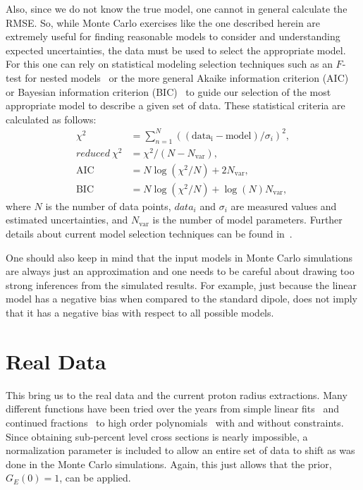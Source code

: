 \documentclass[10pt,aps,prc,twocolumn]{revtex4-1}
\begin{document}
Also, since we do not know the true model, one cannot in general calculate the RMSE. So, while Monte Carlo exercises 
like the one described herein are extremely useful for finding reasonable models to consider and understanding
expected uncertainties, the data must be used to select the appropriate model. 
For this one can rely on statistical modeling selection techniques such as an $F$-test for
nested models~\cite{Bevington:2003,James:2006,Sirca:2016} or the more general Akaike information criterion (AIC)~\cite{Akaike:1974} 
or Bayesian information criterion (BIC)~\cite{Schwarz:1978} 
to guide our selection of the most appropriate model to describe a given set of data.
These statistical criteria are calculated as follows: 
\begin{align}
\chi^2         & = \sum_{n=1}^{N}((\mathrm{data_i} - \mathrm{model}) / \sigma_i)^2, \\
reduced~\chi^2 & = \chi^2/ (N - N_{\mathrm{var}}),  \\
\mathrm{AIC}            & = N \log(\chi^2/N) + 2 N_{\mathrm{var}}, \\
\mathrm{BIC}            & = N \log(\chi^2/N) + \log(N) N_{\mathrm{var}},
\end{align}
where $N$ is the number of data points, $data_i$ and $\sigma_i$ are measured values and estimated uncertainties,
and $N_{\mathrm{var}}$ is the number of model parameters.
Further details about current model selection techniques can be found in~\cite{Ernst:2012}.

One should also keep in mind that the input models in Monte Carlo simulations are always just an approximation
and one needs to be careful about drawing too strong inferences from the simulated results. 
For example, just because the linear model has a negative bias when compared to the standard dipole, 
does not imply that it has a negative bias with respect to all possible models.




\section{Real Data}

This bring us to the real data and the current proton radius extractions.   Many different functions have
been tried over the years from simple linear fits~\cite{Hand:1963zz,Murphy:1974zz} and continued fractions~\cite{Sick:2003gm} 
to high order polynomials~\cite{Bernauer:2013tpr,Lee:2015jqa} with and without constraints.   Since obtaining sub-percent
level cross sections is nearly impossible, a normalization parameter is included to allow an entire set of data to shift
as was done in the Monte Carlo simulations.   Again, this just allows that the prior, $G_E(0)=1$, can be applied.
\end{document}
